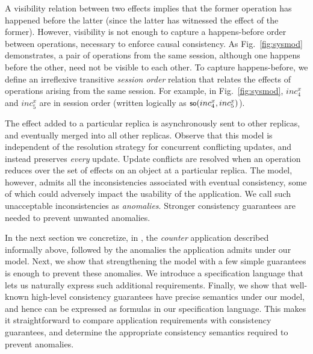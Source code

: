 A visibility relation between two effects implies that the former
operation has happened before the latter (since the latter has
witnessed the effect of the former). However, visibility is not enough
to capture a happens-before order between operations, necessary to
enforce causal consistency. As Fig.~\ref{fig:sysmod} demonstrates, a
pair of operations from the same session, although one happens before
the other, need not be visible to each other. To capture
happens-before, we define an irreflexive transitive \emph{session
  order} relation that relates the effects of operations arising from
the same session. For example, in Fig.~\ref{fig:sysmod}, $inc^x_4$ and
$inc^x_5$ are in session order (written logically as $\small
{\normalfont \textsf{so}(inc^x_4,inc^x_5)}$).

The effect added to a particular replica is asynchronously sent to
other replicas, and eventually merged into all other replicas. Observe
that this model is independent of the resolution strategy for
concurrent conflicting updates, and instead preserves \emph{every}
update. Update conflicts are resolved when an operation reduces over
the set of effects on an object at a particular replica. The model,
however, admits all the inconsistencies associated with eventual
consistency, some of which could adversely impact the usability of the
application. We call such unacceptable inconsistencies as
\emph{anomalies}. Stronger consistency guarantees are needed to
prevent unwanted anomalies.

In the next section we concretize, in \name, the \emph{counter}
application described informally above, followed by the anomalies the
application admits under our model.  Next, we show that strengthening
the model with a few simple guarantees is enough to prevent these
anomalies. We introduce a specification language that lets us
naturally express such additional requirements. Finally, we show that
well-known high-level consistency guarantees have precise semantics
under our model, and hence can be expressed as formulas in our
specification language. This makes it straightforward to compare
application requirements with consistency guarantees, and determine
the appropriate consistency semantics required to prevent anomalies.

